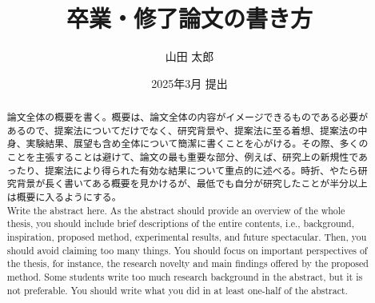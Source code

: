 \documentclass[11pt,a4paper,twoside,openany]{book}
\title{卒業・修了論文の書き方}
\author{山田 太郎}  %
\affiliation{一橋大学大学院\\[.5\zh]ソーシャル・データサイエンス研究科 修士課程}
\date{2025年3月 提出}
\begin{document}
\frontmatter
\maketitle

\begin{abstract}
  論文全体の概要を書く。概要は、論文全体の内容がイメージできるものである必要があるので、提案法についてだけでなく、研究背景や、提案法に至る着想、提案法の中身、実験結果、展望も含め全体について簡潔に書くことを心がける。その際、多くのことを主張することは避けて、論文の最も重要な部分、例えば、研究上の新規性であったり、提案法により得られた有効な結果について重点的に述べる。時折、やたら研究背景が長く書いてある概要を見かけるが、最低でも自分が研究したことが半分以上は概要に入るようにする。 \\
  
  Write the abstract here. As the abstract should provide an overview of the whole thesis, you should include brief descriptions of the entire contents, i.e., background, inspiration, proposed method, experimental results, and future spectacular. Then, you should avoid claiming too many things. You should focus on important perspectives of the thesis, for instance, the research novelty and main findings offered by the proposed method. Some students write too much research background in the abstract, but it is not preferable. You should write what you did in at least one-half of the abstract.
\end{abstract}

\tableofcontents  %
\clearpage

\listoffigures    %
\clearpage

\listoftables     %
\clearpage

\mainmatter








\begin{acks}

\end{acks}
\end{document}
